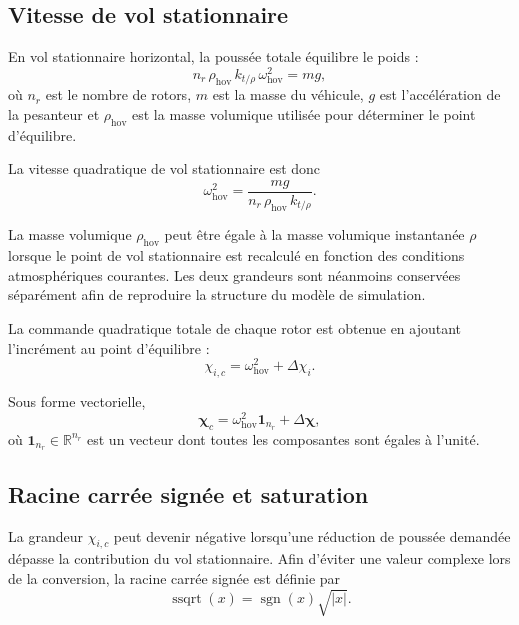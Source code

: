 \documentclass[11pt,a4paper,oneside]{report}
\newcommand{\vect}[1]{\bm{#1}}
\begin{document}
\subsection{Vitesse de vol stationnaire}

En vol stationnaire horizontal, la poussée totale équilibre le poids :
\begin{equation}
	n_r\,\rho_{\mathrm{hov}}\,k_{t/\rho}\,
	\omega_{\mathrm{hov}}^2
	=
	mg,
	\label{eq_hover_force_equilibrium}
\end{equation}
où $n_r$ est le nombre de rotors, $m$ est la masse du véhicule, $g$ est l'accélération de la pesanteur et $\rho_{\mathrm{hov}}$ est la masse volumique utilisée pour déterminer le point d'équilibre.

La vitesse quadratique de vol stationnaire est donc
\begin{equation}
	\omega_{\mathrm{hov}}^2
	=
	\frac{mg}
	{n_r\,\rho_{\mathrm{hov}}\,k_{t/\rho}}.
	\label{eq_hover_squared_speed}
\end{equation}

La masse volumique $\rho_{\mathrm{hov}}$ peut être égale à la masse volumique instantanée $\rho$ lorsque le point de vol stationnaire est recalculé en fonction des conditions atmosphériques courantes. Les deux grandeurs sont néanmoins conservées séparément afin de reproduire la structure du modèle de simulation.

La commande quadratique totale de chaque rotor est obtenue en ajoutant l'incrément au point d'équilibre :
\begin{equation}
	\chi_{i,c}
	=
	\omega_{\mathrm{hov}}^2
	+
	\Delta\chi_i.
	\label{eq_total_signed_squared_speed_command}
\end{equation}

Sous forme vectorielle,
\begin{equation}
	\vect\chi_c
	=
	\omega_{\mathrm{hov}}^2
	\vect 1_{n_r}
	+
	\Delta\vect\chi,
	\label{eq_total_signed_squared_speed_vector}
\end{equation}
où $\vect 1_{n_r}\in\mathbb{R}^{n_r}$ est un vecteur dont toutes les composantes sont égales à l'unité.

\subsection{Racine carrée signée et saturation}

La grandeur $\chi_{i,c}$ peut devenir négative lorsqu'une réduction de poussée demandée dépasse la contribution du vol stationnaire. Afin d'éviter une valeur complexe lors de la conversion, la racine carrée signée est définie par
\begin{equation}
	\operatorname{ssqrt}(x)
	=
	\operatorname{sgn}(x)\sqrt{|x|}.
	\label{eq_signed_square_root}
\end{equation}
\end{document}
